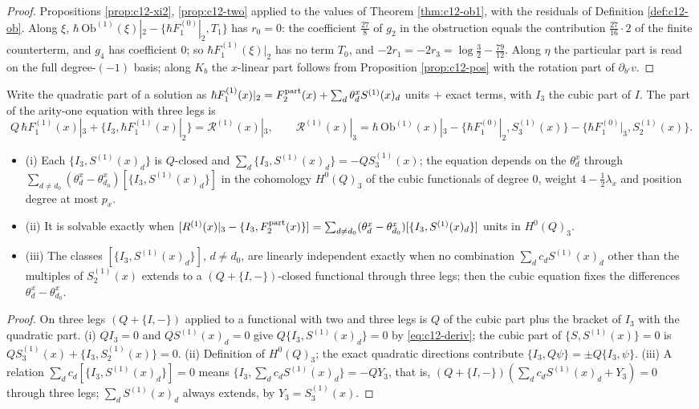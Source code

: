 \begin{proof}
Propositions \ref{prop:c12-xi2}, \ref{prop:c12-two} applied to the values of Theorem \ref{thm:c12-ob1}, with the residuals of Definition \ref{def:c12-ob}. Along $\xi$, $\hbar\,\mathrm{Ob}^{(1)}(\xi)|_2-\{\hbar F_1^{(0)}|_2,T_1\}$ has $r_0=0$: the coefficient $\tfrac{27}8$ of $g_2$ in the obstruction equals the contribution $\tfrac{27}{16}\cdot2$ of the finite counterterm, and $g_4$ has coefficient $0$; so $\hbar F_1^{(1)}(\xi)|_2$ has no term $T_0$, and $-2r_1=-2r_3=\log\tfrac32-\tfrac{79}{12}$. Along $\eta$ the particular part is read on the full degree-$(-1)$ basis; along $K_b$ the $x$-linear part follows from Proposition \ref{prop:c12-pos} with the rotation part of $\partial_{b'}v$.
\end{proof}

\begin{theorem}
\label{thm:c12-cubic}
Write the quadratic part of a solution as $\hbar F_1^{(1)}(x)|_2=F^{\rm part}_2(x)+\sum_d\theta^x_dS^{(1)}(x)_d$ units $+$ exact terms, with $I_3$ the cubic part of $I$. The part of the arity-one equation with three legs is
\[
Q\,\hbar F_1^{(1)}(x)|_3+\{I_3,\hbar F_1^{(1)}(x)|_2\}=\mathcal R^{(1)}(x)|_3,\qquad \mathcal R^{(1)}(x)|_3=\hbar\,\mathrm{Ob}^{(1)}(x)|_3-\{\hbar F_1^{(0)}|_2,S^{(1)}_3(x)\}-\{\hbar F_1^{(0)}|_3,S^{(1)}_2(x)\}.
\]
\begin{itemize}
\item (i) Each $\{I_3,S^{(1)}(x)_d\}$ is $Q$-closed and $\sum_d\{I_3,S^{(1)}(x)_d\}=-QS^{(1)}_3(x)$; the equation depends on the $\theta^x_d$ through $\sum_{d\neq d_0}(\theta^x_d-\theta^x_{d_0})[\{I_3,S^{(1)}(x)_d\}]$ in the cohomology $H^0(Q)_3$ of the cubic functionals of degree $0$, weight $4-\tfrac12\lambda_x$ and position degree at most $p_x$.
\item (ii) It is solvable exactly when $[\mathcal R^{(1)}(x)|_3-\{I_3,F^{\rm part}_2(x)\}]=\sum_{d\neq d_0}(\theta^x_d-\theta^x_{d_0})[\{I_3,S^{(1)}(x)_d\}]$ units in $H^0(Q)_3$.
\item (iii) The classes $[\{I_3,S^{(1)}(x)_d\}]$, $d\neq d_0$, are linearly independent exactly when no combination $\sum_dc_dS^{(1)}(x)_d$ other than the multiples of $S^{(1)}_2(x)$ extends to a $(Q+\{I,-\})$-closed functional through three legs; then the cubic equation fixes the differences $\theta^x_d-\theta^x_{d_0}$.
\end{itemize}
\end{theorem}

\begin{proof}
On three legs $(Q+\{I,-\})$ applied to a functional with two and three legs is $Q$ of the cubic part plus the bracket of $I_3$ with the quadratic part. (i) $QI_3=0$ and $QS^{(1)}(x)_d=0$ give $Q\{I_3,S^{(1)}(x)_d\}=0$ by \eqref{eq:c12-deriv}; the cubic part of $\{S,S^{(1)}(x)\}=0$ is $QS^{(1)}_3(x)+\{I_3,S^{(1)}_2(x)\}=0$. (ii) Definition of $H^0(Q)_3$; the exact quadratic directions contribute $\{I_3,Q\psi\}=\pm Q\{I_3,\psi\}$. (iii) A relation $\sum_dc_d[\{I_3,S^{(1)}(x)_d\}]=0$ means $\{I_3,\sum_dc_dS^{(1)}(x)_d\}=-QY_3$, that is, $(Q+\{I,-\})(\sum_dc_dS^{(1)}(x)_d+Y_3)=0$ through three legs; $\sum_dS^{(1)}(x)_d$ always extends, by $Y_3=S^{(1)}_3(x)$.
\end{proof}

